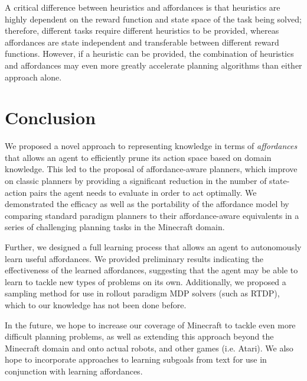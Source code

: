 \documentclass[conference]{IEEEtran}
\begin{document}
A critical difference between heuristics and affordances is that heuristics are highly dependent on the reward function and state space of the task being solved; therefore, different tasks require different heuristics to be provided, whereas affordances are state independent and transferable between different reward functions. However, if a heuristic can be provided, the combination of heuristics and affordances may even more greatly accelerate planning algorithms than either approach alone.


\section{Conclusion}
\label{sec:conclusion}

We proposed a novel approach to representing knowledge in terms of
{\em affordances}~\citep{gibson77} that allows an agent to efficiently
prune its action space based on domain knowledge. This led to the 
proposal of affordance-aware planners, which improve on classic planners
by providing a significant reduction in the number of state-action pairs the
agent needs to evaluate in order to act optimally. We demonstrated the efficacy 
as well as the portability of the affordance model by comparing standard paradigm
planners to their affordance-aware equivalents in a series of challenging planning tasks in the Minecraft
domain.

Further, we designed a full learning process that allows an agent to autonomously learn useful affordances.
We provided preliminary results indicating the effectiveness of the learned affordances, suggesting that
the agent may be able to learn to tackle new types of problems on its own. Additionally, we proposed
a sampling method for use in rollout paradigm MDP solvers (such as RTDP), which to our knowledge has not been done before.

In the future, we hope to increase our coverage of Minecraft to tackle even more difficult planning problems, as well as
extending this approach beyond the Minecraft domain and onto actual robots, and other games (i.e. Atari). We also hope
to incorporate approaches to learning subgoals from text for use in conjunction with learning affordances.

\end{document}
